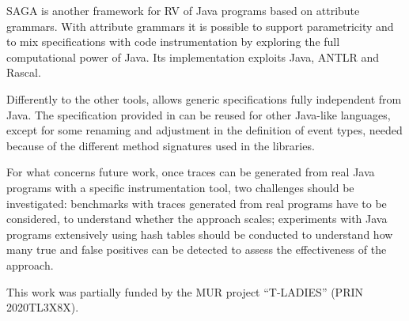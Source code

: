 SAGA  \cite{BoerGouw14} is another framework for RV of Java programs
based on attribute grammars. With attribute grammars it is possible to support parametricity and to mix specifications
with code instrumentation by exploring the full computational power of Java. Its implementation exploits Java, ANTLR and Rascal.

Differently to the other tools, \rml allows generic specifications fully independent from Java.
The specification provided in  can be reused for other Java-like languages, except for some renaming and adjustment
in the definition of event types, needed because of the different method signatures used in the libraries.

For what concerns future work, once traces can be generated from real Java programs with a specific instrumentation tool,
two challenges should be investigated: benchmarks with traces generated from real programs have to be considered, to understand whether
the approach scales; experiments with Java programs extensively using hash tables should be conducted to understand
how many true and false positives can be detected to assess the effectiveness of the approach.



\begin{acks}
This work was partially funded by the MUR project ``T-LADIES'' (PRIN 2020TL3X8X).
\end{acks}

